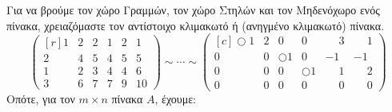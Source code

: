 Για να βρούμε τον χώρο Γραμμών, τον χώρο Στηλών και τον Μηδενόχωρο ενός πίνακα, 
χρειαζόμαστε τον αντίστοιχο κλιμακωτό ή (ανηγμένο κλιμακωτό) πίνακα.
\[
  \begin{pmatrix*}[r]
    1 & 2 & 2 & 1 & 2 & 1 \\
    2 & 4 & 5 & 4 & 5 & 5 \\
    1 & 2 & 3 & 4 & 4 & 6 \\
    3 & 6 & 7 & 7 & 9 & 10 
  \end{pmatrix*} \sim \cdots \sim 
  \begin{pmatrix*}[c]
    \Circle{1} & 2 & 0 & 0 & \phantom{-}3 & \phantom{-}1 \\
    0 & 0 & \Circle{1} & 0 & -1 & -1 \\
    0 & 0 & 0 & \Circle{1} & \phantom{-}1 & \phantom{-}2 \\
    0 & 0 & 0 & 0 & \phantom{-}0 & \phantom{-}0 
  \end{pmatrix*}
\]
Οπότε, για τον $ m \times n $ πίνακα $A$, έχουμε:
